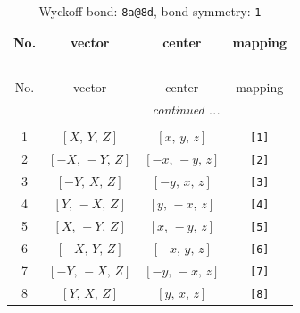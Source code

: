 \documentclass[fleqn,8pt]{jsarticle}
\begin{document}
\begin{longtable}{cccc}
\caption{Wyckoff bond: {\tt 8a@8d}, bond symmetry: {\tt 1}}
 \\
 \hline \hline
No. & vector & center & mapping \\ \hline \endfirsthead

\multicolumn{3}{l}{\tablename\ \thetable{}} \\
 \hline \hline
No. & vector & center & mapping \\ \hline \endhead

 \hline \hline
\multicolumn{3}{r}{\footnotesize\it continued ...} \\ \endfoot

 \hline \hline
\multicolumn{3}{r}{} \\ \endlastfoot

1 & $\left[ X,\, Y,\, Z \right]$ & $\left[ x,\, y,\, z \right]$ & {\tt [1]} \\ \hline
2 & $\left[ - X,\, - Y,\, Z \right]$ & $\left[ - x,\, - y,\, z \right]$ & {\tt [2]} \\ \hline
3 & $\left[ - Y,\, X,\, Z \right]$ & $\left[ - y,\, x,\, z \right]$ & {\tt [3]} \\ \hline
4 & $\left[ Y,\, - X,\, Z \right]$ & $\left[ y,\, - x,\, z \right]$ & {\tt [4]} \\ \hline
5 & $\left[ X,\, - Y,\, Z \right]$ & $\left[ x,\, - y,\, z \right]$ & {\tt [5]} \\ \hline
6 & $\left[ - X,\, Y,\, Z \right]$ & $\left[ - x,\, y,\, z \right]$ & {\tt [6]} \\ \hline
7 & $\left[ - Y,\, - X,\, Z \right]$ & $\left[ - y,\, - x,\, z \right]$ & {\tt [7]} \\ \hline
8 & $\left[ Y,\, X,\, Z \right]$ & $\left[ y,\, x,\, z \right]$ & {\tt [8]} \\
\end{longtable}
\end{document}
